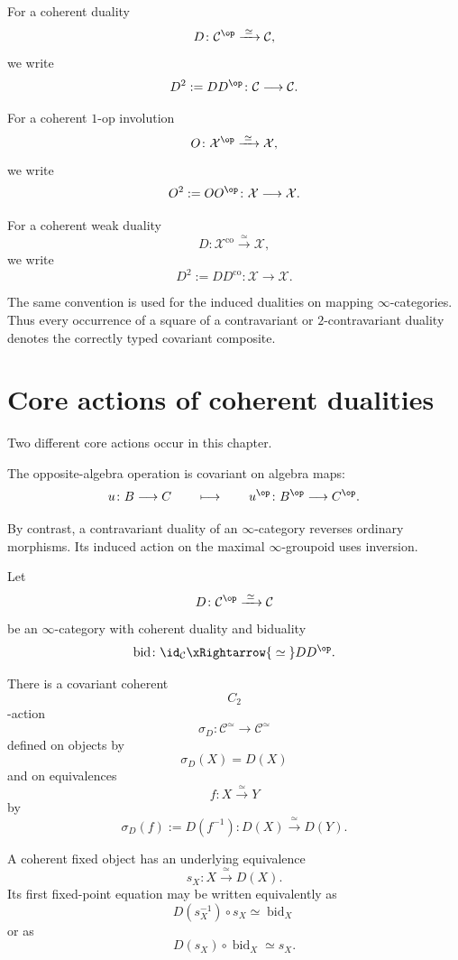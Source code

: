 \begin{convention}
\label{conv:hermitian-morita-iterated-duality}
For a coherent duality
\[
    D
    \colon
    \mathcal C^{\op}
    \xrightarrow{\;\simeq\;}
    \mathcal C,
\]
we write
\[
    D^2
    :=
    DD^{\op}
    \colon
    \mathcal C
    \longrightarrow
    \mathcal C.
\]

For a coherent $1$-op involution
\[
    O
    \colon
    \mathcal X^{\op}
    \xrightarrow{\;\simeq\;}
    \mathcal X,
\]
we write
\[
    O^2
    :=
    OO^{\op}
    \colon
    \mathcal X
    \longrightarrow
    \mathcal X.
\]

For a coherent weak duality
\[
    D
    \colon
    \mathcal X^{\mathrm{co}}
    \xrightarrow{\;\simeq\;}
    \mathcal X,
\]
we write
\[
    D^2
    :=
    DD^{\mathrm{co}}
    \colon
    \mathcal X
    \longrightarrow
    \mathcal X.
\]

The same convention is used for the induced dualities on mapping
$\infty$-categories. Thus every occurrence of a square of a
contravariant or $2$-contravariant duality denotes the correctly typed
covariant composite.
\end{convention}

\section{Core actions of coherent dualities}
\label{sec:core-actions-coherent-dualities}

Two different core actions occur in this chapter.

The opposite-algebra operation is covariant on algebra maps:
\[
    u
    \colon
    B
    \longrightarrow
    C
    \qquad\longmapsto\qquad
    u^{\op}
    \colon
    B^{\op}
    \longrightarrow
    C^{\op}.
\]

By contrast, a contravariant duality of an $\infty$-category reverses
ordinary morphisms. Its induced action on the maximal
$\infty$-groupoid uses inversion.

\begin{lemma}
\label{lem:core-action-coherent-duality}
Let
\[
    D
    \colon
    \mathcal C^{\op}
    \xrightarrow{\;\simeq\;}
    \mathcal C
\]
be an $\infty$-category with coherent duality and biduality
\[
    \operatorname{bid}
    \colon
    \id_{\mathcal C}
    \xRightarrow{\;\simeq\;}
    DD^{\op}.
\]

There is a covariant coherent
\[
    C_2
\]
-action
\[
    \sigma_D
    \colon
    \mathcal C^\simeq
    \longrightarrow
    \mathcal C^\simeq
\]
defined on objects by
\[
    \sigma_D(X)=D(X)
\]
and on equivalences
\[
    f
    \colon
    X
    \xrightarrow{\;\simeq\;}
    Y
\]
by
\[
    \sigma_D(f)
    :=
    D(f^{-1})
    \colon
    D(X)
    \xrightarrow{\;\simeq\;}
    D(Y).
\]

A coherent fixed object has an underlying equivalence
\[
    s_X
    \colon
    X
    \xrightarrow{\;\simeq\;}
    D(X).
\]
Its first fixed-point equation may be written equivalently as
\[
    D(s_X^{-1})\circ s_X
    \simeq
    \operatorname{bid}_X
\]
or as
\[
    D(s_X)\circ\operatorname{bid}_X
    \simeq
    s_X.
\]
\end{lemma}

